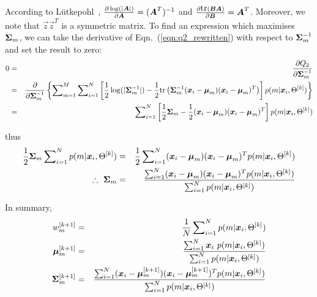 \noindent
According to L\"{u}tkepohl~\cite{Lutkepohl96},
$\frac{\partial \log(|{\boldsymbol{A}}|)}{\partial {\boldsymbol{A}}} = ({\boldsymbol{A}}^{T})^{-1}$
and $\frac{\partial \mbox{tr}({\boldsymbol{B}}{\boldsymbol{A}})}{\partial {\boldsymbol{B}}} = {\boldsymbol{A}}^T$.
Moreover, we note that $\Vec{z}\Vec{z}^T$ is a symmetric matrix.
To find an expression which maximises~${\boldsymbol{\Sigma}}_m$,
we can take the derivative of Eqn.~(\ref{eqn:q2_rewritten}) with respect to ${\boldsymbol{\Sigma}}_m^{-1}$
and set the result to zero:
%
\begin{eqnarray}
	0 & = & \frac{\partial Q_2}{\partial {\boldsymbol{\Sigma}}_m^{-1}}  \\
	~ & = & \frac{\partial}{\partial  {\boldsymbol{\Sigma}}_m^{-1}} \left\{
		\sum\nolimits_{m=1}^{M} \sum\nolimits_{i=1}^{N} \left[
					\frac{1}{2} \log(|{\boldsymbol{\Sigma}}_m^{-1}|) - \frac{1}{2} \mbox{tr}\left({\boldsymbol{\Sigma}}_m^{-1} ({\boldsymbol{x}}_i - {\boldsymbol{\mu}}_m) ({\boldsymbol{x}}_i - {\boldsymbol{\mu}}_m)^T \right)
					\right] p(m|{\boldsymbol{x}}_i, \Theta^{[k]})
	\right\} \\
	~ & = & \sum\nolimits_{i=1}^{N} \left[ \frac{1}{2} {\boldsymbol{\Sigma}}_m - \frac{1}{2} ({\boldsymbol{x}}_i - {\boldsymbol{\mu}}_m) ({\boldsymbol{x}}_i - {\boldsymbol{\mu}}_m)^T \right] p(m|{\boldsymbol{x}}_i, \Theta^{[k]}) \\
\end{eqnarray}%

\noindent
thus
%
\begin{eqnarray}
	\frac{1}{2} {\boldsymbol{\Sigma}}_m \sum\nolimits_{i=1}^{N} p(m|{\boldsymbol{x}}_i, \Theta^{[k]}) & = & \frac{1}{2} \sum\nolimits_{i=1}^{N} 
																		({\boldsymbol{x}}_i - {\boldsymbol{\mu}}_m) ({\boldsymbol{x}}_i - {\boldsymbol{\mu}}_m)^T p(m|{\boldsymbol{x}}_i, \Theta^{[k]}) \\
	\therefore ~ {\boldsymbol{\Sigma}}_m & = & \frac{\sum\nolimits_{i=1}^{N} ({\boldsymbol{x}}_i - {\boldsymbol{\mu}}_m) ({\boldsymbol{x}}_i - {\boldsymbol{\mu}}_m)^T p(m|{\boldsymbol{x}}_i, \Theta^{[k]})}
						{\sum\nolimits_{i=1}^{N} p(m|{\boldsymbol{x}}_i, \Theta^{[k]})}
\end{eqnarray}

\noindent
In summary,
%
\begin{eqnarray}
	w_m^{[k+1]}	& = & \frac{1}{N} \sum\nolimits_{i=1}^{N} p(m|{\boldsymbol{x}}_i, \Theta^{[k]})  \label{eqn:copy_of_solved_alpha}  \\  
	{\boldsymbol{\mu}}_m^{[k+1]} & = & \frac{ \sum\nolimits_{i=1}^{N} {\boldsymbol{x}}_i ~ p(m|{\boldsymbol{x}}_i, \Theta^{[k]}) }
								   { \sum\nolimits_{i=1}^{N} p(m|{\boldsymbol{x}}_i, \Theta^{[k]}) }  \label{eqn:copy_of_solved_mu} \\
	{\boldsymbol{\Sigma}}_m^{[k+1]}	& = & \frac{\sum\nolimits_{i=1}^{N} ({\boldsymbol{x}}_i - {\boldsymbol{\mu}}_m^{[k+1]}) ({\boldsymbol{x}}_i - {\boldsymbol{\mu}}_m^{[k+1]})^T p(m|{\boldsymbol{x}}_i, \Theta^{[k]})}
						{\sum\nolimits_{i=1}^{N} p(m|{\boldsymbol{x}}_i, \Theta^{[k]})}  \label{eqn:copy_of_solved_sigma}
\end{eqnarray}

